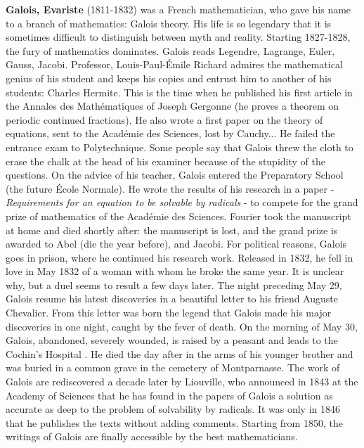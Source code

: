 \textbf{Galois, Evariste} (1811-1832) was a French mathematician, who gave his name to a branch of mathematics: Galois theory. His life is so legendary that it is sometimes difficult to distinguish between myth and reality. Starting 1827-1828, the fury of mathematics dominates. Galois reads Legendre, Lagrange, Euler, Gauss, Jacobi. Professor, Louis-Paul-Émile Richard admires the mathematical genius of his student and keeps his copies and entrust him to another of his students: Charles Hermite. This is the time when he published his first article in the Annales des Mathématiques of Joseph Gergonne (he proves a theorem on periodic continued fractions). He also wrote a first paper on the theory of equations, sent to the Académie des Sciences, lost by Cauchy... He failed the entrance exam to Polytechnique. Some people say that Galois threw the cloth to erase the chalk at the head of his examiner because of the stupidity of the questions. On the advice of his teacher, Galois entered the Preparatory School (the future École Normale). He wrote the results of his research in a paper - \textit{Requirements for an equation to be solvable by radicals} - to compete for the grand prize of mathematics of the Académie des Sciences. Fourier took the manuscript at home and died shortly after: the manuscript is lost, and the grand prize is awarded to Abel (die the year before), and Jacobi. For political reasons, Galois goes in prison, where he continued his research work. Released in 1832, he fell in love in May 1832 of a woman with whom he broke the same year. It is unclear why, but a duel seems to result a few days later. The night preceding May 29, Galois resume his latest discoveries in a beautiful letter to his friend Auguste Chevalier. From this letter was born the legend that Galois made his major discoveries in one night, caught by the fever of death. On the morning of May 30, Galois, abandoned, severely wounded, is raised by a peasant and leads to the Cochin's Hospital . He died the day after in the arms of his younger brother and was buried in a common grave in the cemetery of Montparnasse. The work of Galois are rediscovered a decade later by Liouville, who announced in 1843 at the Academy of Sciences that he has found in the papers of Galois a solution as accurate as deep to the problem of solvability by radicals. It was only in 1846 that he publishes the texts without adding comments. Starting from 1850, the writings of Galois are finally accessible by the best mathematicians.

